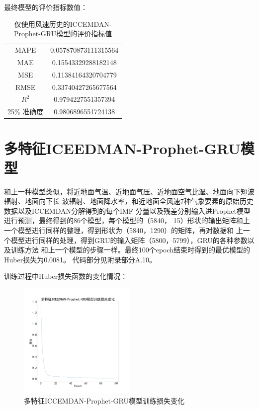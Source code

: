 \documentclass[AutoFakeBold]{LZUThesis}
\begin{document}
最终模型的评价指标数值：

\begin{table}[H]
    \centering
    \caption{仅使用风速历史的ICCEMDAN-Prophet-GRU模型的评价指标值}
    \begin{tabular}{cc}
    \toprule
    MAPE & 0.057870873111315564 \\
    MAE & 0.15543329288182148 \\
    MSE & 0.11384164320704779 \\
    RMSE & 0.33740427265677564 \\
    $R^2$ & 0.9794227551357394 \\
    25\% 准确度 & 0.9806896551724138 \\
    \bottomrule
    \end{tabular}
    \label{wind_prophet_gru_result}
\end{table}

\section{多特征ICEEDMAN-Prophet-GRU模型}

和上一种模型类似，将近地面气温、近地面气压、近地面空气比湿、地面向下短波辐射、地面向下长
波辐射、地面降水率，和近地面全风速7种气象要素的原始历史数据以及ICCEMDAN分解得到的每个IMF
分量以及残差分别输入进Prophet模型进行预测，最终得到的86个模型，每个模型的（5840，
15）形状的输出矩阵和上一个模型进行同样的整理，得到形状为（5840，1290）的矩阵，再对数据和
上一个模型进行同样的处理，得到GRU的输入矩阵（5800，5799），GRU的各种参数以及训练方法
和上一个模型的步骤一样。最终100个epoch结束时得到的最优模型的Huber损失为0.0081。
代码部分见附录部分A.10。

训练过程中Huber损失函数的变化情况：

\begin{figure}[H]
	\centering
    \includegraphics[width=0.5\textwidth]{figures/all_prophet_gru_training_loss.pdf}
    \caption{多特征ICCEMDAN-Prophet-GRU模型训练损失变化}
    \label{fig_all_prophet_gru_training_loss}
\end{figure}
\end{document}
